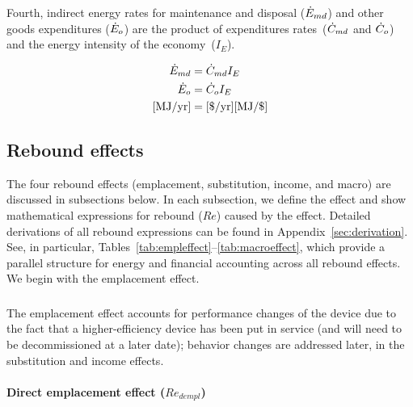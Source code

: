 \documentclass[12pt]{article}\usepackage[]{graphicx}\usepackage[]{xcolor}
\begin{document}
Fourth, indirect energy rates for
maintenance and disposal ($\dot{E}_{md}$) and
other goods expenditures ($\dot{E}_{o}$)
are the product 
of expenditures rates~($\dot{C}_{md}$ and $\dot{C}_o$) and
the energy intensity of the economy~($I_E$).

\begin{align} \label{eq:indirect_energy_rates}
  \dot{E}_{md} &= \dot{C}_{md} I_E \\
  \dot{E}_o     &= \dot{C}_o I_E \\
  \text{[MJ/yr]} &= \text{[\$/yr]}\text{[MJ/\$]} \nonumber
\end{align}









\subsection{Rebound effects}
\label{sec:rebound_effects}

The four rebound effects
(emplacement, substitution, income, and macro)
are discussed in subsections below.
In each subsection, we
define the effect and
show mathematical expressions for rebound ($Re$) caused by the effect.
Detailed derivations of all rebound expressions 
can be found in Appendix~\ref{sec:derivation}.
See, in particular, Tables~\ref{tab:empleffect}--\ref{tab:macroeffect},
which provide a parallel structure for energy and financial accounting
across all rebound effects.
We begin with the emplacement effect.


\subsubsection{\Empleffect}
\label{sec:empl_effect_main_paper}

The emplacement effect accounts for performance changes of the device
due to the fact that a higher-efficiency device has been put in service 
(and will need to be decommissioned at a later date);
behavior changes are addressed later,
in the substitution and income effects. 


\paragraph{Direct emplacement effect ($Re_{dempl}$)} 
\end{document}
